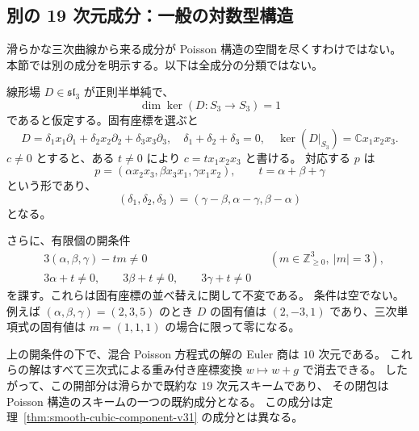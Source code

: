 \subsection{別の 19 次元成分：一般の対数型構造}
\label{subsec:logcanonical-component-v31}

滑らかな三次曲線から来る成分が Poisson 構造の空間を尽くすわけではない。
本節では別の成分を明示する。以下は全成分の分類ではない。

線形場 $D\in\mathfrak{sl}_3$ が正則半単純で、
\[
 \dim\ker(D:S_3\longrightarrow S_3)=1
\]
であると仮定する。固有座標を選ぶと
\[
 D=\delta_1x_1\partial_1+\delta_2x_2\partial_2+
     \delta_3x_3\partial_3,
 \quad \delta_1+\delta_2+\delta_3=0,
 \quad \ker(D|_{S_3})=\mathbb Cx_1x_2x_3.
\]
$c\neq0$ とすると、ある $t\neq0$ により $c=tx_1x_2x_3$ と書ける。
対応する $p$ は
\[
 p=(\alpha x_2x_3,\beta x_3x_1,\gamma x_1x_2),
 \qquad t=\alpha+\beta+\gamma
\]
という形であり、
\[
 (\delta_1,\delta_2,\delta_3)
 =(\gamma-\beta,\alpha-\gamma,\beta-\alpha)
\]
となる。

さらに、有限個の開条件
\begin{align*}
 &3(\alpha,\beta,\gamma)-tm\neq0
 &&(m\in\mathbb Z_{\geq0}^3,\ |m|=3),\\
 &3\alpha+t\neq0,\qquad3\beta+t\neq0,\qquad3\gamma+t\neq0
\end{align*}
を課す。これらは固有座標の並べ替えに関して不変である。
条件は空でない。例えば $(\alpha,\beta,\gamma)=(2,3,5)$ のとき
$D$ の固有値は $(2,-3,1)$ であり、三次単項式の固有値は
$m=(1,1,1)$ の場合に限って零になる。

\begin{theorem}[対数型の開成分]
\label{thm:logcanonical-component-v31}
上の開条件の下で、混合 Poisson 方程式の解の Euler 商は $10$ 次元である。
これらの解はすべて三次式による重み付き座標変換 $w\mapsto w+g$ で消去できる。
したがって、この開部分は滑らかで既約な $19$ 次元スキームであり、
その閉包は Poisson 構造のスキームの一つの既約成分となる。
この成分は定理~\ref{thm:smooth-cubic-component-v31} の成分とは異なる。
\end{theorem}

